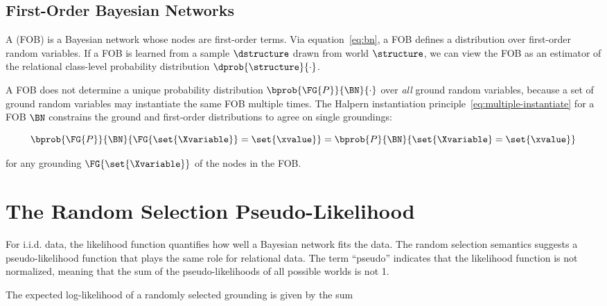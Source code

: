 \documentclass{article}
\begin{document}
\subsection{First-Order Bayesian Networks}

A  (FOB) is a Bayesian network whose nodes are first-order terms. Via equation~\ref{eq:bn}, a FOB defines a distribution over first-order random variables. If a FOB is learned from a sample $\dstructure$ drawn from world $\structure$, we can view the FOB as an estimator of the relational class-level probability distribution $\dprob{\structure}{\cdot}$. 


A FOB does not determine a unique probability distribution $\bprob{\FG{P}}{\BN}{\cdot}$ over {\em all} ground random variables, because a set of ground random variables may instantiate the same FOB multiple times. The Halpern instantiation principle~\eqref{eq:multiple-instantiate} for a FOB $\BN$ constrains the ground and first-order distributions to agree on single groundings:

\begin{equation} \label{eq:halpern-bn}
\bprob
{\FG{P}}{\BN}{\FG{\set{\Xvariable}} = \set{\xvalue}} 
= 
\bprob
{P}
{\BN}
{\set{\Xvariable}=\set{\xvalue}}
\end{equation}

for any grounding $\FG{\set{\Xvariable}}$ of the nodes in the FOB.
%
%



\section{The Random Selection Pseudo-Likelihood}

For i.i.d. data, the likelihood function quantifies how well a Bayesian network fits the data. The random selection semantics suggests a pseudo-likelihood function that plays the same role for relational data. The term ``pseudo'' indicates that the likelihood function is not normalized, meaning that the sum of the pseudo-likelihoods of all possible worlds is not 1. 

The expected log-likelihood of a randomly selected grounding is given by the sum
\end{document}
